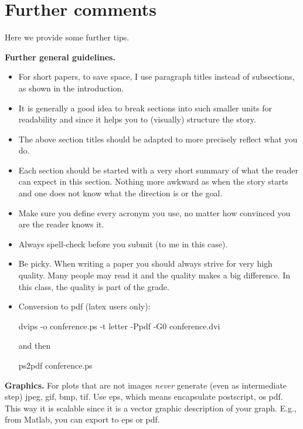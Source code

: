 \documentclass[letterpaper]{article}
\newcommand{\mypar}[1]{{\bf #1.}}
\begin{document}
\section{Further comments}

Here we provide some further tips.

\mypar{Further general guidelines}

\begin{itemize}
\item For short papers, to save space, I use paragraph titles instead of
subsections, as shown in the introduction.

\item It is generally a good idea to break sections into such smaller
units for readability and since it helps you to (visually) structure the story.

\item The above section titles should be adapted to more precisely
reflect what you do.

\item Each section should be started with a very
short summary of what the reader can expect in this section. Nothing
more awkward as when the story starts and one does not know what the
direction is or the goal.

\item Make sure you define every acronym you use, no matter how
convinced you are the reader knows it.

\item Always spell-check before you submit (to me in this case).

\item Be picky. When writing a paper you should always strive for very
high quality. Many people may read it and the quality makes a big difference.
In this class, the quality is part of the grade.

\item Conversion to pdf (latex users only): 

dvips -o conference.ps -t letter -Ppdf -G0 conference.dvi

and then

ps2pdf conference.ps
\end{itemize}

\mypar{Graphics} For plots that are not images {\em never} generate (even as intermediate step)
jpeg, gif, bmp, tif. Use eps, which means encapsulate postscript, os pdf. This way it is
scalable since it is a vector graphic description of your graph. E.g.,
from Matlab, you can export to eps or pdf.
\end{document}

